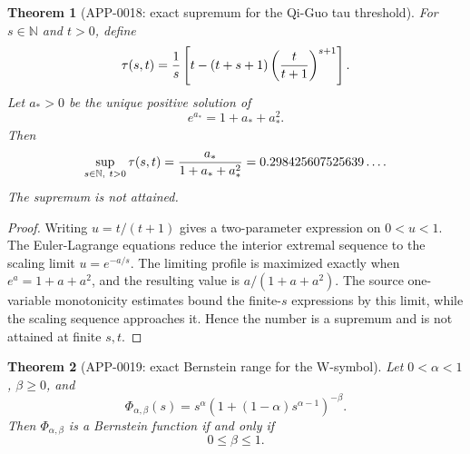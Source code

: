 \documentclass[11pt]{article}
\numberwithin{equation}{section}
\newtheorem{theorem}{Theorem}[section]
\theoremstyle{definition}
\theoremstyle{remark}
\newcommand{\1}{\mathbf 1}
\begin{document}
\begin{theorem}[APP-0018: exact supremum for the Qi-Guo tau threshold]
\label{thm:app18-qg-tau}
For \(s\in\mathbb N\) and \(t>0\), define
\[
  \tau(s,t)={1\over s}\left[t-(t+s+1)
        \left({t\over t+1}\right)^{s+1}\right].
\]
Let \(a_*>0\) be the unique positive solution of
\[
  e^{a_*}=1+a_*+a_*^2 .
\]
Then
\[
  \sup_{s\in\mathbb N,\ t>0}\tau(s,t)
   ={a_*\over 1+a_*+a_*^2}
   =0.298425607525639\ldots .
\]
The supremum is not attained.
\end{theorem}

\begin{proof}
Writing \(u=t/(t+1)\) gives a two-parameter expression on \(0<u<1\).  The
Euler-Lagrange equations reduce the interior extremal sequence to the scaling
limit \(u=e^{-a/s}\).  The limiting profile is maximized exactly when
\(e^a=1+a+a^2\), and the resulting value is \(a/(1+a+a^2)\).  The source
one-variable monotonicity estimates bound the finite-\(s\) expressions by this
limit, while the scaling sequence approaches it.  Hence the number is a
supremum and is not attained at finite \(s,t\).
\end{proof}

\begin{theorem}[APP-0019: exact Bernstein range for the W-symbol]
\label{thm:app19-w-symbol}
Let \(0<\alpha<1\), \(\beta\ge0\), and
\[
  \Phi_{\alpha,\beta}(s)
     =s^\alpha\left(1+(1-\alpha)s^{\alpha-1}\right)^{-\beta}.
\]
Then \(\Phi_{\alpha,\beta}\) is a Bernstein function if and only if
\[
  0\le \beta\le 1 .
\]
\end{theorem}
\end{document}
